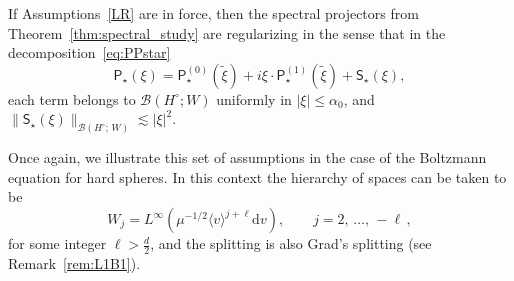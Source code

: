 \documentclass[AHL,Unicode,longabstracts,published]{cedram}
\renewcommand{\d}{\mathrm{d}}
\newcommand{\sfS}{\mathsf{S}}
\newcommand{\PP}{\mathsf{P}}
\newcommand{\BBB}{\mathscr{B}}
\newcommand{\Ssm}{H^{\circ}}
\newcommand{\Sr}{W}
\renewcommand*\le{\leqslant}
\newcommand{\la}{\langle}
\newcommand{\ra}{\rangle}
\begin{document}
\begin{theo}\label{thm:regularized_thm}
If Assumptions~\eqref{LR} are in force, then the spectral projectors from Theorem~\ref{thm:spectral_study} are regularizing in the sense that in the decomposition~\eqref{eq:PPstar}
\begin{equation*}
\PP_\star(\xi) = \PP^{(0)}_\star\left(\widetilde{\xi} \right) + i \xi \cdot \PP_\star^{(1)}\left(\widetilde{\xi} \right) + \sfS_{\star}(\xi),
\end{equation*}
each term belongs to $\BBB(\Ssm ; \Sr )$ uniformly in $|\xi| \le \alpha_{0}$, and $\| \sfS_\star(\xi) \|_{ \BBB(\Ssm;\,\Sr) } \lesssim | \xi |^2$.
\end{theo}

\begin{rema}
Once again, we illustrate this set of assumptions in the case of the Boltzmann equation for hard spheres. In this context the hierarchy of spaces can be taken to be
\[
\Sr_j = L^\infty\left(\mu^{-1/2} \la v \ra^{j + \ell} \d v \right), \qquad j=2,\,\ldots,\,-\ell\,,
\]
for some integer $\ell > \frac{d}{2}$, and the splitting is also Grad's splitting (see Remark~\ref{rem:L1B1}).
\end{rema}
\end{document}
